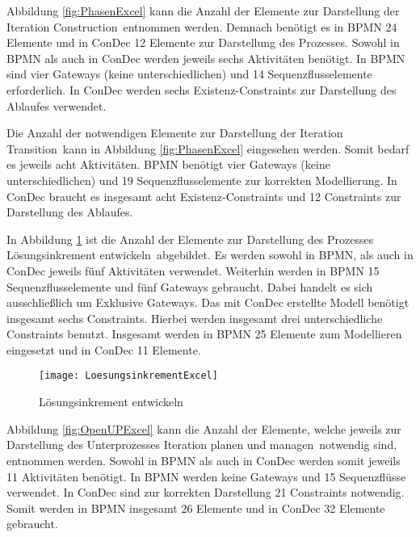 Abbildung \ref{fig:PhasenExcel} kann die Anzahl der Elemente zur Darstellung der Iteration \grqq Construction\grqq \ entnommen werden. Demnach benötigt es in BPMN 24 Elemente und in ConDec 12 Elemente zur Darstellung des Prozesses. Sowohl in BPMN als auch in ConDec werden jeweils sechs Aktivitäten benötigt. In BPMN sind vier Gateways (keine unterschiedlichen) und 14 Sequenzflusselemente erforderlich. In ConDec werden sechs Existenz-Constraints zur Darstellung des Ablaufes verwendet.\newline


Die Anzahl der notwendigen Elemente zur Darstellung der Iteration \grqq Transition\grqq \ kann in Abbildung \ref{fig:PhasenExcel} eingesehen werden. Somit bedarf es jeweils acht Aktivitäten. BPMN benötigt vier Gateways (keine unterschiedlichen) und 19 Sequenzflusselemente zur korrekten Modellierung. In ConDec braucht es insgesamt acht Existenz-Constraints und 12 Constraints zur Darstellung des Ablaufes.\newline


In Abbildung \ref{fig:LoesungsinkrementExcel} ist die Anzahl der Elemente zur Darstellung des Prozesses \grqq Lösungsinkrement entwickeln\grqq \ abgebildet. Es werden sowohl in BPMN, als auch in ConDec jeweils fünf Aktivitäten verwendet. Weiterhin werden in BPMN 15 Sequenzflusselemente und fünf Gateways gebraucht. Dabei handelt es sich ausschließlich um Exklusive Gateways. Das mit ConDec erstellte Modell benötigt insgesamt sechs Constraints. Hierbei werden insgesamt drei unterschiedliche Constraints benutzt. Insgesamt werden in BPMN 25 Elemente zum Modellieren eingesetzt und in ConDec 11 Elemente.\newline

\begin{figure}[htp]
\begin{center}
  \texttt{[image: LoesungsinkrementExcel]} %
  \caption{Lösungsinkrement entwickeln}
  \label{fig:LoesungsinkrementExcel}
\end{center}
\end{figure}


Abbildung \ref{fig:OpenUPExcel} kann die Anzahl der Elemente, welche jeweils zur Darstellung des Unterprozesses \grqq Iteration planen und managen\grqq \ notwendig sind, entnommen werden. Sowohl in BPMN als auch in ConDec werden somit jeweils 11 Aktivitäten benötigt. In BPMN werden keine Gateways und 15 Sequenzflüsse verwendet. In ConDec sind zur korrekten Darstellung 21 Constraints notwendig. Somit werden in BPMN insgesamt 26 Elemente und in ConDec 32 Elemente gebraucht.\newline

